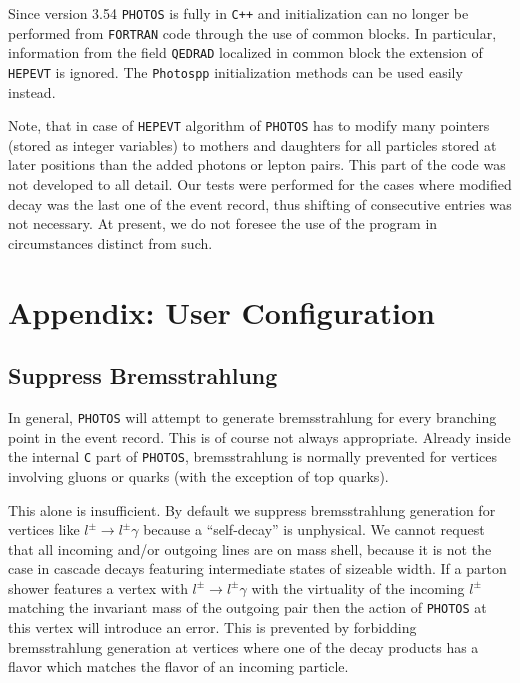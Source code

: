\documentclass[]{Photos_interface_design}
\begin{document}
Since version 3.54 {\tt PHOTOS} is fully in {\tt C++} and initialization can no longer
be performed from {\tt FORTRAN} code through the use of common blocks. 
In particular, information from the field 
{\tt QEDRAD} localized in common block 
{\tt } the extension of {\tt HEPEVT} is ignored. 
The  {\tt Photospp} initialization methods can be used easily instead.

Note, that in case of  {\tt HEPEVT} algorithm of  {\tt PHOTOS}
has to modify many pointers (stored as integer variables) to mothers 
and daughters for all particles stored at later positions than the added 
photons or lepton pairs. This part of the code was not developed to all  detail.
Our tests were performed for the cases where modified decay was the last one of the event record, thus  shifting of consecutive entries was not necessary.
At present, we do not foresee the use of the program in circumstances distinct from such.

\section{Appendix: User Configuration}
\label{sec:User Configuration}

\subsection{Suppress Bremsstrahlung}
\label{section:suppress}

In general, {\tt PHOTOS} will attempt to generate bremsstrahlung for every 
branching point in the event record. This is of course not always appropriate.
Already inside the internal {\tt C} part of {\tt PHOTOS}, 
bremsstrahlung is normally prevented for vertices involving gluons or quarks 
(with the exception of top quarks).

This alone is insufficient. By default we suppress bremsstrahlung
generation for vertices like $l^\pm \to l^\pm \gamma$ because a
``self-decay'' is unphysical. We cannot request that all incoming
and/or outgoing lines are on mass shell, because it is not the case in
cascade decays featuring intermediate states of sizeable width. If a
parton shower features a vertex with $l^\pm \to l^\pm \gamma$ with the
virtuality of the incoming $l^\pm$ matching the invariant mass of the
outgoing pair then the action of {\tt PHOTOS} at this vertex will
introduce an error.  This is prevented by forbidding bremsstrahlung
generation at vertices where one of the decay products has a flavor
which matches the flavor of an incoming particle.
\end{document}
